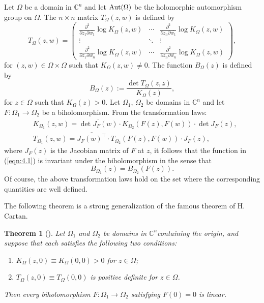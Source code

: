 \documentclass[12pt]{amsart}
\numberwithin{equation}{section}
\newtheorem{theorem}{Theorem}[section]
\theoremstyle{definition}
\theoremstyle{remark}
\newcommand{\C}{{\mathbb C}}
\newcommand{\1}{{\bf 1}}
\begin{document}
Let $\Omega$ be a domain in $\C^n$ and
let ${\rm Aut}(\Omega)$ 
be the holomorphic automorphism group 
on $\Omega$. 
The $n \times n$ matrix $T_{\Omega}(z,w)$ 
is defined by
\begin{equation*}
T_{\Omega}(z,w)=
\begin{pmatrix} \displaystyle
\frac{\partial^2}{\partial z_1 \partial \overline{w_1}} 
\log K_{\Omega}(z,w) & \cdots &  
\displaystyle
\frac{\partial^2}{\partial z_n \partial \overline{w_1}} 
\log K_{\Omega}(z,w)\\
\vdots & \ddots & \vdots \\
\displaystyle
\frac{\partial^2}{\partial z_1 \partial \overline{w_n}} 
\log K_{\Omega}(z,w) & \cdots &  
\displaystyle
\frac{\partial^2}{\partial z_n \partial \overline{w_n}} 
\log K_{\Omega}(z,w)
\end{pmatrix},
\end{equation*}
for $(z,w)\in\Omega\times\Omega$ such that 
$K_{\Omega}(z,w)\neq 0$.
The function $B_{\Omega}(z)$ is defined by 
\begin{equation}\label{eqn:4.1}
B_{\Omega}(z):=
\frac{\det T_{\Omega}(z,z)}{K_{\Omega}(z)},
\end{equation}
for $z\in\Omega$ such that $K_{\Omega}(z)>0$. 
Let $\Omega_1$, $\Omega_2$ be domains
in $\C^n$ and let $F:\Omega_1\to\Omega_2$
be a biholomorphism.
From the transformation laws:
\begin{equation*}
\begin{split}
&K_{\Omega_1}(z,w)=
\overline{\det J_F(w)}\cdot
K_{\Omega_2}(F(z),F(w))\cdot
\det J_F(z), \\
&T_{\Omega_1}(z,w)=
\overline{J_F(w)^{\intercal}}\cdot
T_{\Omega_2}(F(z),F(w))\cdot
J_F(z), 
\end{split}
\end{equation*}
where $J_F(z)$ is the Jacobian matrix of $F$ at $z$, 
it follows that the function in (\ref{eqn:4.1}) is invariant 
under the biholomorphism in the sense that 
\begin{equation}\label{eqn:4.2}
B_{\Omega_1}(z)=B_{\Omega_2}(F(z)).
\end{equation}
Of course, the above transformation laws 
hold on the set where the corresponding quantities 
are well defined.

The following theorem 
is a strong generalization of 
the famous theorem of H. Cartan. 

\begin{theorem}[\cite{IsK10, Yam14,  KNY14}]
Let $\Omega_1$ 
and $\Omega_2$ be domains in $\C^n$containing the origin, 
and 
suppose that each satisfies the following two conditions:
\begin{enumerate}
\item 
$K_{\Omega}(z,0)\equiv 
K_{\Omega}(0,0)>0$ for $z\in\Omega$;
\item
$T_{\Omega}(z,0)\equiv T_{\Omega}(0,0)$ is positive definite
for $z\in\Omega$.
\end{enumerate}
Then every biholomorphism $F:\Omega_1\to\Omega_2$ 
satisfying $F(0)=0$ is linear.
\end{theorem}
\end{document}
